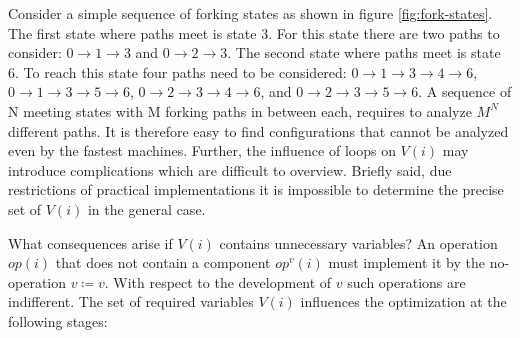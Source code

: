 \documentclass[12pt,a4paper]{scrartcl}
\begin{document}
Consider a simple sequence of forking states as shown in figure
\ref{fig:fork-states}.  The first state where paths meet is state 3. For this
state there are two paths to consider: $0 \rightarrow 1 \rightarrow 3$ and $0
\rightarrow 2 \rightarrow 3$.  The second state where paths meet is state 6. To
reach this state four paths need to be considered: $0 \rightarrow 1 \rightarrow
3 \rightarrow 4 \rightarrow 6$, $0 \rightarrow 1 \rightarrow 3 \rightarrow 5
\rightarrow 6$, $0 \rightarrow 2 \rightarrow 3 \rightarrow 4 \rightarrow 6$,
and $0 \rightarrow 2 \rightarrow 3 \rightarrow 5 \rightarrow 6$. A sequence of
N meeting states with M forking paths in between each, requires to analyze
$M^N$ different paths.  It is therefore easy to find configurations that cannot
be analyzed even by the fastest machines.  Further, the influence of loops on
$V(i)$ may introduce complications which are difficult to overview.  Briefly
said, due restrictions of practical implementations it is impossible to
determine the precise set of $V(i)$ in the general case. 

What consequences arise if $V(i)$ contains unnecessary variables?  An operation
$op(i)$ that does not contain a component $op^v(i)$ must implement it by the
no-operation $v\coloneqq v$. With respect to the development of $v$ such
operations are indifferent. The set of required variables $V(i)$ influences the
optimization at the following stages:
\end{document}
